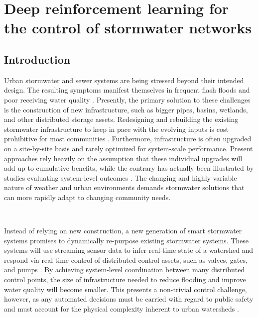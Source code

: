 \chapter{Deep reinforcement learning for
the control of stormwater
networks}\label{ch:rl}

\vspace{1cm}

\section{Introduction}

Urban stormwater and sewer systems are being stressed beyond their intended design.
The resulting symptoms manifest themselves in frequent flash floods \cite{LarisKarklisBefore-and-afterPost} and poor receiving water quality \cite{Watson2016TheHypoxia}.
Presently, the primary solution to these challenges is the construction of new infrastructure, such as bigger pipes, basins, wetlands, and other distributed storage assets.
Redesigning and rebuilding the existing stormwater infrastructure to keep in pace with the evolving inputs is cost prohibitive for most communities \cite{kerkez2016}.
Furthermore, infrastructure is often upgraded on a site-by-site basis and rarely optimized for system-scale performance.
Present approaches rely heavily on the assumption that these individual upgrades will add up to cumulative benefits, while the contrary has actually been illustrated by studies evaluating system-level outcomes \cite{Emerson2005Watershed-ScaleBasins}.
The changing and highly variable nature of weather and urban environments demands stormwater solutions that can more rapidly adapt to changing community needs.

\

Instead of relying on new construction, a new generation of smart stormwater systems promises to dynamically re-purpose existing stormwater systems.
These systems will use streaming sensor data to infer real-time state of a watershed and respond via real-time control of distributed control assets, such as valves, gates, and pumps \cite{kerkez2016}.
By achieving system-level coordination between many distributed control points, the size of infrastructure needed to reduce flooding and improve water quality will become smaller.
This presents a non-trivial control challenge, however, as any automated decisions must be carried with regard to public safety and must account for the physical complexity inherent to urban watersheds \cite{Mullapudi_Wong_Kerkez_2017, Schutze2004RealToday}.

